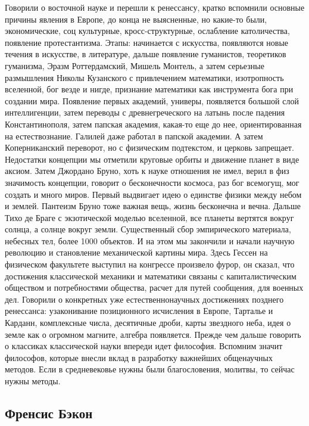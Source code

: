 \documentclass[a4paper, 12pt]{article}
\begin{document}
Говорили о восточной науке и перешли к ренессансу, кратко вспомнили 
основные причины явления в Европе, до конца не выясненные, но какие-то 
были, экономические, соц культурные, кросс-структурные, ослабление 
католичества, появление протестантизма. Этапы: начинается с искусства, 
появляются новые течения в искусстве, в литературе, дальше появление 
гуманистов, теоретиков гуманизма, Эразм Роттердамский, Мишель Монтель, 
а затем серьезные размышления Николы Кузанского с привлечением 
математики, изотропность вселенной, бог везде и нигде, признание 
математики как инструмента бога при создании мира. Появление первых 
академий, универы, появляется большой слой интеллигенции, затем переводы 
с древнегреческого на латынь после падения Константинополя, затем 
папская академия, какая-то еще до нее, ориентированная на 
естествознание. Галилей даже работал в папской академии. А затем 
Коперниканский переворот, но с физическим подтекстом, и церковь 
запрещает. Недостатки концепции мы отметили круговые орбиты и движение 
планет в виде аксиом. Затем Джордано Бруно, хоть к науке отношения не 
имел, верил в физ значимость концепции, говорит о бесконечности космоса, 
раз бог всемогущ, мог создать и много миров. Первый выдвигает идею 
о единстве физики между небом и землей. Пантеизм Бруно тоже важная вещь, 
жизнь бесконечна и вечна. Дальше Тихо де Браге с экзотической моделью 
вселенной, все планеты вертятся вокруг солнца, а солнце вокруг земли. 
Существенный сбор эмпирического материала, небесных тел, более 1000 
объектов. И на этом мы закончили и начали научную революцию 
и становление механической картины мира. Здесь Гессен на физическом 
факультете выступил на конгрессе произвело фурор, он сказал, что 
достижения классической механики и математики связаны 
с капиталистическим обществом и потребностями общества, расчет для путей 
сообщения, для военных дел. Говорили о конкретных уже естественнонаучных 
достижениях позднего ренессанса: узаконивание позиционного исчисления 
в Европе, Тарталье и Карданн, комплексные числа, десятичные дроби, карты 
звездного неба, идея о земле как о огромном магните, алгебра появляется. 
Прежде чем дальше говорить о классиках классической науки впереди идет 
философия. Вспомним значит философов, которые внесли вклад в разработку 
важнейших общенаучных методов. Если в средневековье нужны были 
благословения, молитвы, то сейчас нужны методы.


\subsection{Френсис Бэкон}
\end{document}
